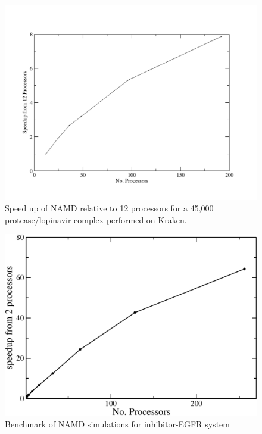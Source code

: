 \documentclass[a4paper,10pt]{article}
\begin{document}
\begin{figure}
  \begin{center}
    \includegraphics[width=0.8\linewidth]{subproject2-hiv/kraken_scale}
    \caption{Speed up of NAMD relative to 12 processors for a 45,000 protease/lopinavir complex performed on Kraken.}
    \label{fig:scale_kraken}
  \end{center}
\end{figure}

%
\begin{figure}
\centering
\includegraphics[scale=0.45]{subproject3-egfr/benchmark}
\caption{Benchmark of NAMD simulations for inhibitor-EGFR system}\label{fig:benchmark}
\end{figure}
\end{document}
